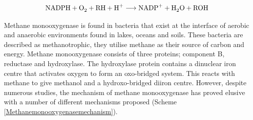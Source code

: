 \vspace{-0.8 cm}
\begin{equation}
\ce{NADPH + O2 + RH + H+} \longrightarrow \ce{NADP+ + H2O + ROH}
\label{Methanemonooxygenaseequation}
\end{equation}

Methane monooxygenase is found in bacteria that exist at the interface of aerobic and anaerobic environments found in lakes, oceans and soils.\cite{Lipscomb1994}  These bacteria are described as methanotrophic, they utilise methane as their source of carbon and energy.\cite{Haber1983}  Methane monooxygenase consists of three proteins; component B, reductase and hydroxylase.\cite{Lipscomb1994}  The hydroxylase protein contains a dinuclear iron centre that activates oxygen to form an oxo-bridged system.  This reacts with methane to give methanol and a hydroxo-bridged diiron centre.\cite{Merkx2001}  However, despite numerous studies,\cite{Lipscomb1994, Merkx2001, Tinberg2011} the mechanism of methane monooxygenase has proved elusive with a number of different mechanisms proposed (Scheme \ref{Methanemonooxygenasemechanism}).



